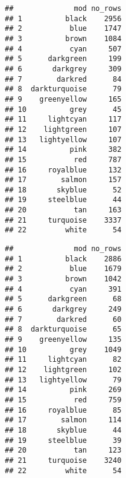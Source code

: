 \documentclass[]{article}
\newenvironment{Shaded}{\begin{snugshade}}{\end{snugshade}}
\newcommand{\DataTypeTok}[1]{\textcolor[rgb]{0.13,0.29,0.53}{#1}}
\newcommand{\KeywordTok}[1]{\textcolor[rgb]{0.13,0.29,0.53}{\textbf{#1}}}
\newcommand{\NormalTok}[1]{#1}
\newcommand{\OperatorTok}[1]{\textcolor[rgb]{0.81,0.36,0.00}{\textbf{#1}}}
\newcommand{\StringTok}[1]{\textcolor[rgb]{0.31,0.60,0.02}{#1}}
\begin{document}
\begin{Shaded}
\end{Shaded}

\begin{verbatim}
##              mod no_rows
## 1          black    2956
## 2           blue    1747
## 3          brown    1084
## 4           cyan     507
## 5      darkgreen     199
## 6       darkgrey     309
## 7        darkred      84
## 8  darkturquoise      79
## 9    greenyellow     165
## 10          grey      45
## 11     lightcyan     117
## 12    lightgreen     107
## 13   lightyellow     107
## 14          pink     382
## 15           red     787
## 16     royalblue     132
## 17        salmon     157
## 18       skyblue      52
## 19     steelblue      44
## 20           tan     163
## 21     turquoise    3337
## 22         white      54
\end{verbatim}

\begin{Shaded}
\end{Shaded}

\begin{verbatim}
##              mod no_rows
## 1          black    2886
## 2           blue    1679
## 3          brown    1042
## 4           cyan     391
## 5      darkgreen      68
## 6       darkgrey     249
## 7        darkred      60
## 8  darkturquoise      65
## 9    greenyellow     135
## 10          grey    1049
## 11     lightcyan      82
## 12    lightgreen     102
## 13   lightyellow      79
## 14          pink     269
## 15           red     759
## 16     royalblue      85
## 17        salmon     114
## 18       skyblue      44
## 19     steelblue      39
## 20           tan     123
## 21     turquoise    3240
## 22         white      54
\end{verbatim}
\end{document}
